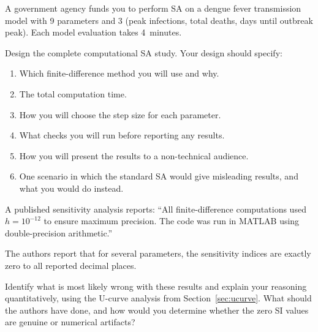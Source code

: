 \begin{exercise}[\bloom{L5}]
\label{ex:ch3:studydesign}
A government agency funds you to perform SA on a dengue fever
transmission model with 9 parameters and 3 \QOIs
(peak infections, total deaths, days until outbreak peak).
Each model evaluation takes 4~minutes.

Design the complete computational SA study.
Your design should specify:
\begin{enumerate}[label=(\alph*)]
  \item Which finite-difference method you will use and why.
  \item The total computation time.
  \item How you will choose the step size for each parameter.
  \item What checks you will run before reporting any results.
  \item How you will present the results to a non-technical audience.
  \item One scenario in which the standard SA would give misleading
        results, and what you would do instead.
\end{enumerate}
\end{exercise}

\begin{exercise}[\bloom{L6}]
\label{ex:ch3:critique}
A published sensitivity analysis reports:
``All finite-difference computations used $h = 10^{-12}$
to ensure maximum precision. The code was run in MATLAB
using double-precision arithmetic.''

The authors report that for several parameters, the sensitivity
indices are exactly zero to all reported decimal places.

Identify what is most likely wrong with these results
and explain your reasoning quantitatively, using the
U-curve analysis from Section~\ref{sec:ucurve}.
What should the authors have done, and how would you
determine whether the zero SI values are genuine or numerical artifacts?
\end{exercise}


